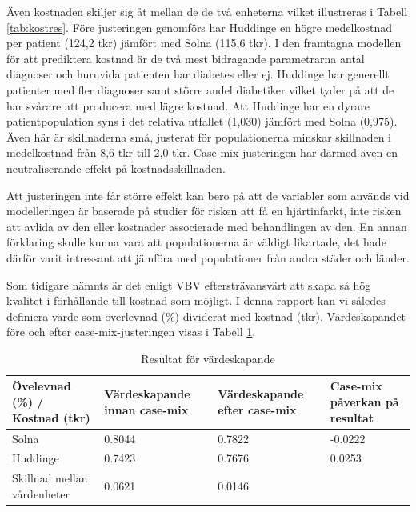 Även kostnaden skiljer sig åt mellan de de två enheterna vilket illustreras i Tabell \ref{tab:kostres}. Före justeringen genomförs har Huddinge en högre medelkostnad per patient (124,2 tkr) jämfört med Solna (115,6 tkr). I den framtagna modellen för att prediktera kostnad är de två mest bidragande parametrarna antal diagnoser och huruvida patienten har diabetes eller ej. Huddinge har generellt patienter med fler diagnoser samt större andel diabetiker vilket tyder på att de har svårare att producera med lägre kostnad. Att Huddinge har en dyrare patientpopulation syns i det relativa utfallet (1,030) jämfört med Solna (0,975). Även här är skillnaderna små, justerat för populationerna minskar skillnaden i medelkostnad från 8,6 tkr till 2,0 tkr. Case-mix-justeringen har därmed även en neutraliserande effekt på kostnadsskillnaden.

Att justeringen inte får större effekt kan bero på att de variabler som används vid modelleringen är baserade på studier för risken att få en hjärtinfarkt, inte risken att avlida av den eller kostnader associerade med behandlingen av den. En annan förklaring skulle kunna vara att populationerna är väldigt likartade, det hade därför varit intressant att jämföra med populationer från andra städer och länder.

Som tidigare nämnts är det enligt VBV eftersträvansvärt att skapa så hög kvalitet i förhållande till kostnad som möjligt. I denna rapport kan vi således definiera värde som överlevnad (\%) dividerat med kostnad (tkr). Värdeskapandet före och efter case-mix-justeringen visas i Tabell \ref{tab:varderes}.

\begin{table}[h]
\centering
\caption{Resultat för värdeskapande}
\label{tab:varderes}
\begin{tabular}{|p{4cm}|p{3cm}|p{2.5cm}|p{3.5cm}|}
\hline
Övelevnad (\%) / Kostnad (tkr)           & Värdeskapande innan case-mix & Värdeskapande efter case-mix & Case-mix påverkan på resultat \\ \hline
Solna                       & 0.8044                       & 0.7822                       & -0.0222                       \\ \hline
Huddinge                    & 0.7423                       & 0.7676                       & 0.0253                        \\ \hline
Skillnad mellan \linebreak vårdenheter & 0.0621                       & 0.0146                       &                               \\ \hline
\end{tabular}
\end{table}

